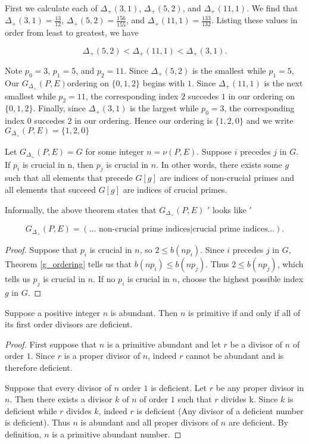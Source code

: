 \documentclass[../paper.tex]{subfiles}
\begin{document}
First we calculate each of $\Delta_{+}(3,1)$, $\Delta_{+}(5,2)$, 
and $\Delta_{+}(11,1)$. We find that 
$\Delta_{+}(3,1) = \frac{13}{12}$,
$\Delta_{+}(5,2) = \frac{156}{155}$, and
$\Delta_{+}(11,1)= \frac{133}{132}$.
Listing these values in order from least to greatest, we have

$$\Delta_{+}(5,2) < \Delta_{+}(11,1) < \Delta_{+}(3,1).$$

Note $p_0 = 3$, $p_1 = 5$, and $p_2 = 11$. Since $\Delta_+(5,2)$
is the smallest while $p_1 = 5$, Our $G_{\Delta_{+}}(P, E)$ordering on $\{0, 1, 2\}$
begins with $1$. Since $\Delta_+(11,1)$ is the next smallest while
$p_2 = 11$, the corresponding index $2$ succedes $1$ in our
ordering on $\{0,1,2\}$. Finally, since $\Delta_+(3,1)$ is the largest
while $p_0 = 3$, the corresponding index $0$ succedes $2$ in our
ordering. Hence our ordering is $\{1, 2, 0\}$ and we write 
$G_{\Delta_+}(P,E) = \{1, 2, 0\}$ 

\begin{theorem}\label{crucial_thm}
Let $G_{\Delta_+}(P,E) = G$ for some integer $n = \nu (P,E)$.
Suppose $i$ precedes $j$ in $G$. If $p_i$ is crucial in n,
then $p_j$ is crucial in $n$. In other words, there exists some $g$
such that all elements that precede $G[g]$ are indices of non-crucial 
primes and all elements that succeed $G[g]$ are indices of crucial primes.
\end{theorem}

Informally, the above theorem states that $G_{\Delta_+}(P,E)$ 
$'$ looks like $'$

$$ G_{\Delta_+}(P, E) = (\text{... non-crucial prime indices} 
                        | \text{crucial prime indices...}) . $$
\begin{proof}

Suppose that
$p_i$ is crucial in $n$, so $2 \leq b(n p_i)$. Since $i$ precedes 
$j$ in $G$, Theorem {\ref{g_ordering}} tells us that $b(n p_i) \leq b(n
p_j)$. Thus $2 \leq b(n p_j)$, which tells us $p_j$ is crucial in $n$. 
If no $p_i$ is crucial in $n$, choose the highest possible index $g$ in $G$.


\end{proof}


\begin{theorem}\label{del_minus_thm}
Suppose a positive integer $n$ is abundant. Then $n$ is primitive if and 
only if all of its first order divisors are deficient.
\end{theorem}

\begin{proof}
	First suppose that $n$ is a primitive abundant and let $r$ be a
divisor of $n$ of order $1$. Since $r$ is a proper divisor of $n$,
indeed $r$ cannot be abundant and is therefore deficient.

	Suppose that every divisor of $n$ order $1$ is deficient. Let 
$r$ be any proper divisor in $n$. Then there exists a divisor $k$ 
of $n$ of order $1$ such that $r$ divides k. Since $k$ is 
deficient while $r$ divides $k$, indeed $r$ is deficient (Any divisor of a 
deficient number is deficient). Thus $n$
is abundant and all proper divisors of $n$ are deficient. By 
definition, $n$ is a primitive abundant number. 
\end{proof}
\end{document}
